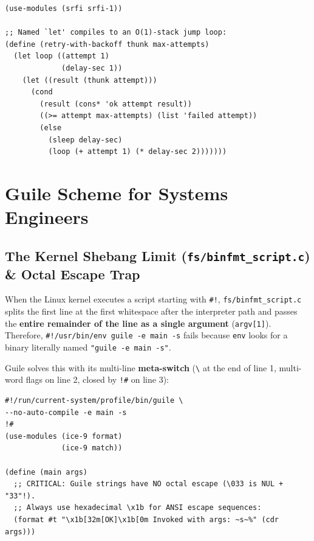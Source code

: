 \documentclass[11pt,oneside]{book}
\begin{document}
\begin{lstlisting}[language=GuileScheme]
(use-modules (srfi srfi-1))

;; Named `let' compiles to an O(1)-stack jump loop:
(define (retry-with-backoff thunk max-attempts)
  (let loop ((attempt 1)
             (delay-sec 1))
    (let ((result (thunk attempt)))
      (cond
        (result (cons* 'ok attempt result))
        ((>= attempt max-attempts) (list 'failed attempt))
        (else
          (sleep delay-sec)
          (loop (+ attempt 1) (* delay-sec 2)))))))
\end{lstlisting}

\chapter{Guile Scheme for Systems Engineers}

\section{The Kernel Shebang Limit (\texttt{fs/binfmt\_script.c}) \& Octal Escape Trap}

When the Linux kernel executes a script starting with \texttt{\#!}, \texttt{fs/binfmt\_script.c} splits the first line at the first whitespace after the interpreter path and passes the \textbf{entire remainder of the line as a single argument} (\texttt{argv[1]}). Therefore, \texttt{\#!/usr/bin/env guile -e main -s} fails because \texttt{env} looks for a binary literally named \texttt{"guile -e main -s"}.

Guile solves this with its multi-line \textbf{meta-switch} (\texttt{\textbackslash} at the end of line 1, multi-word flags on line 2, closed by \texttt{!\#} on line 3):

\begin{lstlisting}[language=GuileScheme]
#!/run/current-system/profile/bin/guile \
--no-auto-compile -e main -s
!#
(use-modules (ice-9 format)
             (ice-9 match))

(define (main args)
  ;; CRITICAL: Guile strings have NO octal escape (\033 is NUL + "33"!).
  ;; Always use hexadecimal \x1b for ANSI escape sequences:
  (format #t "\x1b[32m[OK]\x1b[0m Invoked with args: ~s~%" (cdr args)))
\end{lstlisting}
\end{document}
